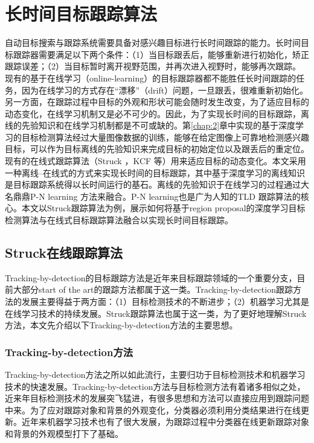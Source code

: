 \chapter{长时间目标跟踪算法}
\hspace*{0.85cm}自动目标搜索与跟踪系统需要具备对感兴趣目标进行长时间跟踪的能力。长时间目标跟踪器需要满足以下两个条件：（1）当目标跟丢后，能够重新进行初始化，矫正跟踪误差；（2）当目标暂时离开视野范围，并再次进入视野时，能够再次跟踪。
现有的基于在线学习（online-learning）的目标跟踪器都不能胜任长时间跟踪的任务，因为在线学习的方式存在``漂移''（drift）问题，一旦跟丢，很难重新初始化。另一方面，在跟踪过程中目标的外观和形状可能会随时发生改变，为了适应目标的动态变化，在线学习机制又是必不可少的。因此，为了实现长时间的目标跟踪，离线的先验知识和在线学习机制都是不可或缺的。第\ref{chap:2}章中实现的基于深度学习的目标检测算法经过大量图像数据的训练，能够在给定图像上可靠地检测感兴趣目标，可以作为目标离线的先验知识来完成目标的初始定位以及跟丢后的重定位。现有的在线式跟踪算法（Struck \cite{struck}，KCF \cite{kcf} 等）用来适应目标的动态变化。本文采用一种离线--在线式的方式来实现长时间的目标跟踪，其中基于深度学习的离线知识是目标跟踪系统得以长时间运行的基石。离线的先验知识于在线学习的过程通过大名鼎鼎P-N learning \cite{p-n} 方法来融合。P-N learning也是广为人知的TLD \cite{tld} 跟踪算法的核心。本文以Struck跟踪算法为例，展示如何将基于region proposal的深度学习目标检测算法与在线式目标跟踪算法融合以实现长时间目标跟踪。

\section{Struck在线跟踪算法}
Tracking-by-detection的目标跟踪方法是近年来目标跟踪领域的一个重要分支，目前大部分start of the art的跟踪方法都属于这一类。Tracking-by-detection跟踪方法的发展主要得益于两方面：（1）目标检测技术的不断进步；（2）机器学习尤其是在线学习技术的持续发展。Struck跟踪算法也属于这一类，为了更好地理解Struck方法，本文先介绍以下Tracking-by-detection方法的主要思想。
\subsection{Tracking-by-detection方法}
Tracking-by-detection方法之所以如此流行，主要归功于目标检测技术和机器学习技术的快速发展。Tracking-by-detection方法与目标检测方法有着诸多相似之处，近来年目标检测技术的发展突飞猛进，有很多思想和方法可以直接应用到跟踪问题中来。为了应对跟踪对象和背景的外观变化，分类器必须利用分类结果进行在线更新。近年来机器学习技术也有了很大发展，为跟踪过程中分类器在线更新跟踪对象和背景的外观模型打下了基础。

